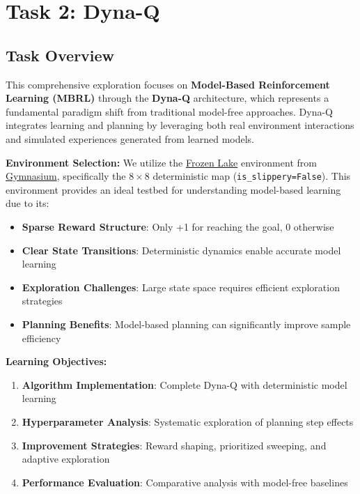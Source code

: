 \section{Task 2: Dyna-Q}

\subsection{Task Overview} 
This comprehensive exploration focuses on \textbf{Model-Based Reinforcement Learning (MBRL)} through the \textbf{Dyna-Q} architecture, which represents a fundamental paradigm shift from traditional model-free approaches. Dyna-Q integrates learning and planning by leveraging both real environment interactions and simulated experiences generated from learned models.

\textbf{Environment Selection:} We utilize the \href{https://gymnasium.farama.org/environments/toy_text/frozen_lake/}{Frozen Lake} environment from \href{https://gymnasium.farama.org}{Gymnasium}, specifically the \texttt{$8 \times 8$} deterministic map (\texttt{is\_slippery=False}). This environment provides an ideal testbed for understanding model-based learning due to its:
\begin{itemize}
    \item \textbf{Sparse Reward Structure}: Only +1 for reaching the goal, 0 otherwise
    \item \textbf{Clear State Transitions}: Deterministic dynamics enable accurate model learning
    \item \textbf{Exploration Challenges}: Large state space requires efficient exploration strategies
    \item \textbf{Planning Benefits}: Model-based planning can significantly improve sample efficiency
\end{itemize}

\textbf{Learning Objectives:}
\begin{enumerate}
    \item \textbf{Algorithm Implementation}: Complete Dyna-Q with deterministic model learning
    \item \textbf{Hyperparameter Analysis}: Systematic exploration of planning step effects
    \item \textbf{Improvement Strategies}: Reward shaping, prioritized sweeping, and adaptive exploration
    \item \textbf{Performance Evaluation}: Comparative analysis with model-free baselines
\end{enumerate}

